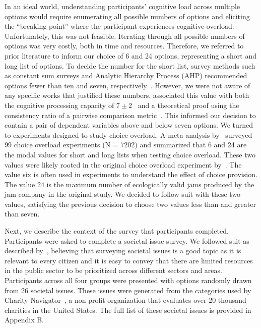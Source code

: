 In an ideal world, understanding participants' cognitive load across multiple options would require enumerating all possible numbers of options and eliciting the ``breaking point'' where the participant experiences cognitive overload. Unfortunately, this was not feasible. Iterating through all possible numbers of options was very costly, both in time and resources. Therefore, we referred to prior literature to inform our choice of 6 and 24 options, representing a short and long list of options. To decide the number for the short list, survey methods such as constant sum surveys and Analytic Hierarchy Process (AHP) recommended options fewer than ten and seven, respectively~\cite{moroneyQuestionnaireDesignHow2019, saatyGroupDecisionMaking2013, saatyPrinciplesAnalyticHierarchy1987}. However, we were not aware of any specific works that justified these numbers. \textcite{saatyPrinciplesAnalyticHierarchy1987} associated this value with both the cognitive processing capacity of $7\pm2$~\cite{millerMagicalNumberSeven1956} and a theoretical proof using the consistency ratio of a pairwise comparison metric~\cite{saaty2003magic}. This informed our decision to contain a pair of dependent variables above and below seven options. We turned to experiments designed to study choice overload. A meta-analysis by~\textcite{chernevChoiceOverloadConceptual2015} surveyed 99 choice overload experiments (N = 7202) and summarized that 6 and 24 are the modal values for short and long lists when testing choice overload. These two values were likely rooted in the original choice overload experiment by~\textcite{iyengarWhenChoiceDemotivating2000}. The value six is often used in experiments to understand the effect of choice provision. The value 24 is the maximum number of ecologically valid jams produced by the jam company in the original study. We decided to follow suit with these two values, satisfying the previous decision to choose two values less than and greater than seven.

Next, we describe the context of the survey that participants completed. Participants were asked to complete a societal issue survey. We followed suit as described by~\textcite{chengCanShowWhat2021}, believing that surveying societal issues is a good topic as it is relevant to every citizen and it is easy to convey that there are limited resources in the public sector to be prioritized across different sectors and areas. Participants across all four groups were presented with options randomly drawn from 26 societal issues. These issues were generated from the categories used by Charity Navigator~\cite{CharityNavigator2023}, a non-profit organization that evaluates over 20 thousand charities in the United States. The full list of these societal issues is provided in Appendix B.

